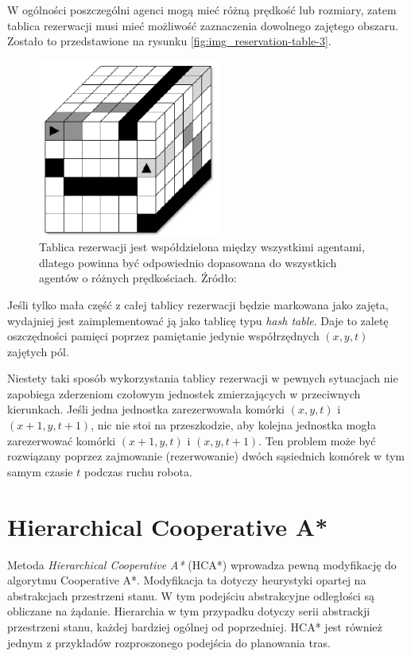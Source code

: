 W ogólności poszczególni agenci mogą mieć różną prędkość lub rozmiary, zatem tablica rezerwacji musi mieć możliwość zaznaczenia dowolnego zajętego obszaru. Zostało to przedstawione na rysunku \ref{fig:img_reservation-table-3}.

\begin{figure}
	\centering
	\includegraphics[width=6cm]{img/reservation-table-3}
	\caption{Tablica rezerwacji jest współdzielona między wszystkimi agentami, dlatego powinna być odpowiednio dopasowana do wszystkich agentów o różnych prędkościach. Źródło: \cite{cooppath}}
	\label{fig:img_reservation-table-2}
\end{figure}

Jeśli tylko mała część z całej tablicy rezerwacji będzie markowana jako zajęta, wydajniej jest zaimplementować ją jako tablicę typu {\it hash table}. Daje to zaletę oszczędności pamięci poprzez pamiętanie jedynie współrzędnych $(x, y, t)$ zajętych pól.

Niestety taki sposób wykorzystania tablicy rezerwacji w pewnych sytuacjach nie zapobiega zderzeniom czołowym jednostek zmierzających w przeciwnych kierunkach.
Jeśli jedna jednostka zarezerwowała komórki $(x, y, t)$ i $(x + 1, y, t + 1)$, nic nie stoi na przeszkodzie, aby kolejna jednostka mogła zarezerwować komórki $(x + 1, y, t)$ i $(x, y, t + 1)$. Ten problem może być rozwiązany poprzez zajmowanie (rezerwowanie) dwóch sąsiednich komórek w tym samym czasie $t$ podczas ruchu robota.

\section{Hierarchical Cooperative A*}
\label{ch:hier_cooperative_a}
Metoda {\it Hierarchical Cooperative A*} (HCA*) wprowadza pewną modyfikację do algorytmu Cooperative A*. Modyfikacja ta dotyczy heurystyki opartej na abstrakcjach przestrzeni stanu. W tym podejściu abstrakcyjne odległości są obliczane na żądanie. Hierarchia w tym przypadku dotyczy serii abstrackji przestrzeni stanu, każdej bardziej ogólnej od poprzedniej. \cite{cooppath}
HCA* jest również jednym z przykładów rozproszonego podejścia do planowania tras.

